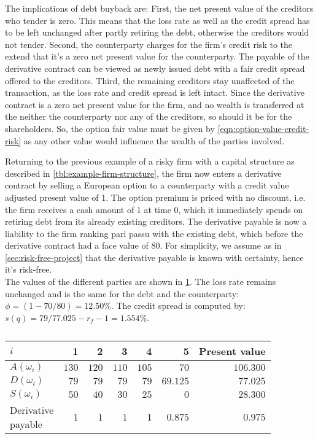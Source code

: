 \documentclass[../main.tex]{subfiles}
\begin{document}
            The implications of debt buyback are: First, the net present value of the creditors who tender is zero. This means that the loss rate as well as the credit spread has to be left unchanged after partly retiring the debt, otherwise the creditors would not tender. Second, the counterparty charges for the firm's credit risk to the extend that it's a zero net present value for the counterparty. The payable of the derivative contract can be viewed as newly issued debt with a fair credit spread offered to the creditors.
            Third, the remaining creditors stay unaffected of the transaction, as the loss rate and credit spread is left intact. Since the derivative contract is a zero net present value for the firm, and no wealth is transferred at the neither the counterparty nor any of the creditors, so should it be for the shareholders. So, the option fair value must be given by \cref{eqn:option-value-credit-risk} as any other value would influence the wealth of the parties involved.

            Returning to the previous example of a risky firm with a capital structure as described in \cref{tbl:example-firm-structure}, the firm now enters a derivative contract by selling a European option to a counterparty with a credit value adjusted present value of 1. The option premium is priced with no discount, i.e. the firm receives a cash amount of 1 at time 0, which it immediately spends on retiring debt from its already existing creditors. The derivative payable is now a liability to the firm ranking pari passu with the existing debt, which before the derivative contract had a face value of 80. For simplicity, we assume as in \cref{sec:risk-free-project} that the derivative payable is known with certainty, hence it's risk-free.\\
            The values of the different parties are shown in \cref{tbl:example-debt-retiring}. The loss rate remains unchanged and is the same for the debt and the counterparty: $\phi=\left(1-70/80\right)=12.50\%$. The credit spread is computed by: $s(q)=79/77.025-r_{f}-1=1.554\%$.
            
            \begin{table}[h]
                \centering
                \begin{tabular}{l|rrrrr||r}
                    $i$ & 1 & 2 & 3 & 4 & 5 & Present value \\
                    \hline
                    $A(\omega_{i})$ & $130$ & $120$ & $110$ & $105$ & $70$ & $106.300$ \\
                    $D(\omega_{i})$ & $79$ & $79$ & $79$ & $79$ & $69.125$ & $77.025$ \\
                    $S(\omega_{i})$ & $50$ & $40$ & $30$ & $25$ & $0$ & $28.300$ \\
                    \makecell{Derivative \\payable} & $1$ & $1$ & $1$ & $1$ & $0.875$ & $0.975$ \\
                \end{tabular}
                \caption{}
                \label{tbl:example-debt-retiring}
            \end{table}
\end{document}
